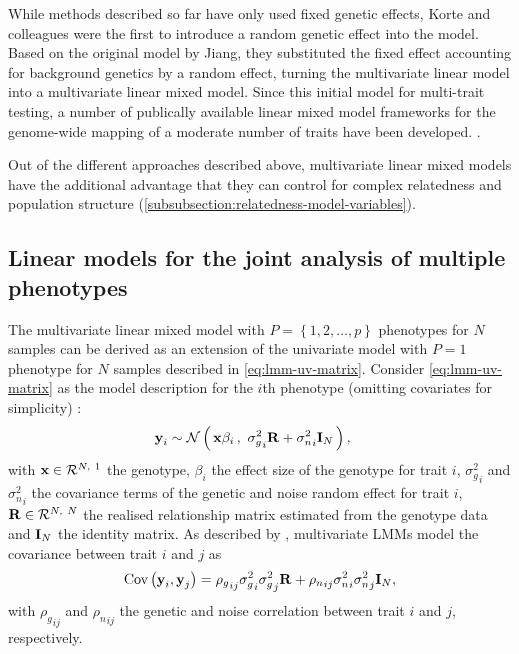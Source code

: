 While methods described so far have only used fixed genetic effects, Korte and colleagues \parencite*{Korte2012} were the first to introduce a random genetic effect into the model. Based on the original model by Jiang, they substituted the fixed effect accounting for background genetics by a random effect, turning the multivariate linear model into a multivariate linear mixed model. Since this initial model for multi-trait testing, a number of publically available linear mixed model frameworks for the genome-wide mapping of a moderate number of traits have been developed. \citep{Yang2014,Lippert2014,Zhou2014,Casale2015}. 

Out of the different approaches described above, multivariate linear mixed models have the additional advantage that they can control for complex relatedness and population structure (\cref{subsubsection:relatedness-model-variables}). 

\subsection{Linear models for the joint analysis of multiple phenotypes}
The multivariate linear mixed model with \(P=\left\{1,2,\dots,p\right\}\) phenotypes for \(N\) samples can be derived as an extension of the univariate model with \(P=1\) phenotype for \(N\) samples described in \cref{eq:lmm-uv-matrix}. Consider \cref{eq:lmm-uv-matrix} as the model description for the \(i\)th phenotype (omitting covariates for simplicity) :
\begin{align} 
\boldsymbol{\mathbf{y}}_i &\sim \mathcal{N}\left(\,{\boldsymbol{\mathbf{x}}\beta_i}\,,~{{\sigma_g^2}_i\boldsymbol{\mathbf{R}} + {\sigma_n^2}_i\boldsymbol{\mathbf{I}}_N}\,\right),
\label{eq:lmm-mv-p}
\end{align}
%
with \(\boldsymbol{\mathbf{x}} \in \mathcal{R}^{N,~1}\) the genotype, \(\beta_i\) the effect size of the genotype for trait \(i\),  \({\sigma_g^2}_i\) and \({\sigma_n^2}_i\) the covariance terms of the genetic and noise random effect for trait \(i\), \(\boldsymbol{\mathbf{R}} \in \mathcal{R}^{N,~N}\)  the realised relationship matrix estimated from the genotype data and \(\boldsymbol{\mathbf{I}}_N\) the identity matrix. As described by \citet{Henderson1976}, multivariate LMMs model the covariance between trait \(i\) and \(j\) as
\begin{align}
\text{Cov}\left(\boldsymbol{\mathbf{y}}_i, \boldsymbol{\mathbf{y}}_j\right) = {\rho_g}_{ij}{\sigma_g^2}_i{\sigma_g^2}_j\boldsymbol{\mathbf{R}} +  {\rho_n}_{ij}{\sigma_n^2}_i{\sigma_n^2}_j\boldsymbol{\mathbf{I}}_N,
\label{eq:cov-lmm-mv}
\end{align}
%
with \( {\rho_g}_{ij}\) and \( {\rho_n}_{ij}\) the genetic and noise correlation between trait \(i\) and \(j\), respectively. 

